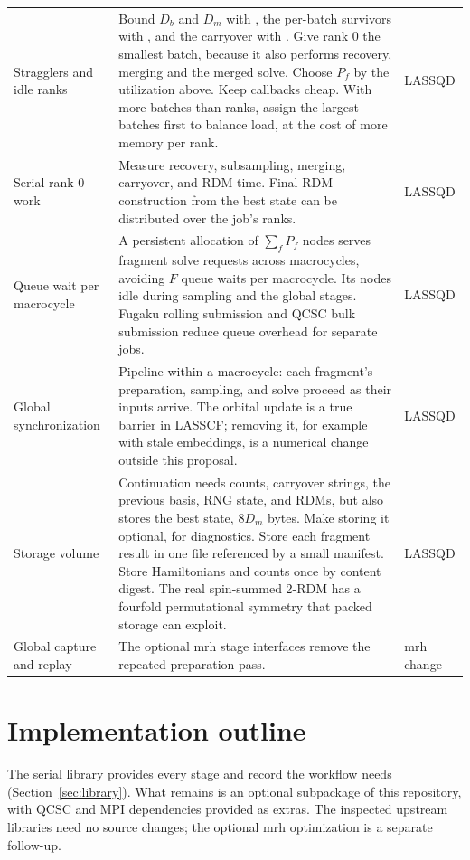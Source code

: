 \documentclass[11pt,a4paper]{article}
\newcommand{\code}[1]{\texttt{\detokenize{#1}}}
\begin{document}
{\begin{longtable}{@{}>{\raggedright\arraybackslash}p{2.6cm}%
>{\raggedright\arraybackslash}p{\dimexpr\textwidth-4.5cm-4\tabcolsep\relax}%
>{\raggedright\arraybackslash}p{1.9cm}@{}}
Stragglers and idle ranks &
Bound $D_b$ and $D_m$ with \code{max_dim}, the per-batch survivors with
\code{max_strings_per_trim}, and the carryover with \code{max_carryover}. Give
rank 0 the smallest batch, because it also performs recovery, merging and the
merged solve. Choose $P_f$ by the utilization above. Keep callbacks cheap. With
more batches than ranks, assign the largest batches first to balance load, at
the cost of more memory per rank. &
LASSQD \\ \addlinespace
Serial rank-0 work &
Measure recovery, subsampling, merging, carryover, and RDM time. Final RDM
construction from the best state can be distributed over the job's ranks. &
LASSQD \\ \addlinespace
Queue wait per macrocycle &
A persistent allocation of $\sum_f P_f$ nodes serves fragment solve requests
across macrocycles, avoiding $F$ queue waits per macrocycle. Its nodes idle
during sampling and the global stages. Fugaku rolling submission and QCSC bulk
submission reduce queue overhead for separate jobs. &
LASSQD \\ \addlinespace
Global synchronization &
Pipeline within a macrocycle: each fragment's preparation, sampling, and solve
proceed as their inputs arrive. The orbital update is a true barrier in
LASSCF; removing it, for example with stale embeddings, is a numerical change
outside this proposal. &
LASSQD \\ \addlinespace
Storage volume &
Continuation needs counts, carryover strings, the previous basis, RNG state,
and RDMs, but \code{FragmentResult} also stores the best state, $8D_m$ bytes.
Make storing it optional, for diagnostics. Store
each fragment result in one file referenced by a small manifest. Store
Hamiltonians and counts once by content digest. The real spin-summed 2-RDM
has a fourfold permutational symmetry that packed storage can exploit. &
LASSQD \\ \addlinespace
Global capture and replay &
The optional mrh stage interfaces remove the repeated preparation pass. &
mrh change \\
\end{longtable}}

\section{Implementation outline}
\label{sec:implementation}

The serial library provides every stage and record the workflow needs
(Section~\ref{sec:library}). What remains is an optional \code{lassqd.distributed} subpackage
of this repository, with QCSC and MPI dependencies provided as extras. The
inspected upstream libraries need no source changes; the optional mrh
optimization is a separate follow-up.
\end{document}
